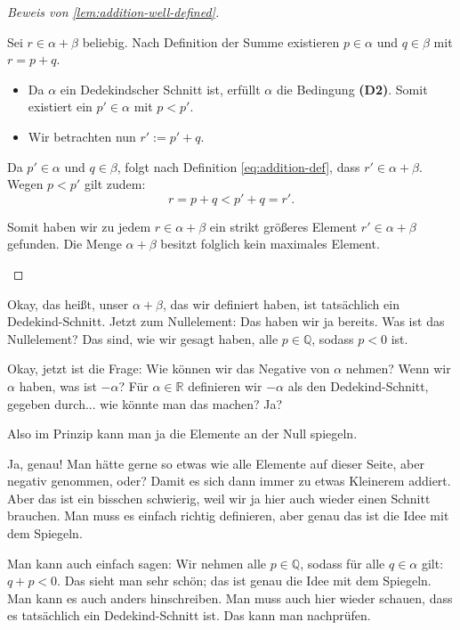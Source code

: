 \begin{proof}[Beweis von \cref{lem:addition-well-defined}]
\begin{math-stroke}
Sei $r \in\alpha + \beta$ beliebig. Nach Definition der Summe existieren $p \in \alpha$ und $q \in \beta$ mit $r = p + q$.

\begin{itemize}
    \item Da $\alpha$ ein Dedekindscher Schnitt ist, erfüllt $\alpha$ die Bedingung \textbf{(D2)}. Somit existiert ein $p' \in \alpha$ mit $p < p'$.
    \item Wir betrachten nun $r' := p' + q$. 
\end{itemize}

Da $p' \in \alpha$ und $q \in \beta$, folgt nach Definition \eqref{eq:addition-def}, dass $r' \in \alpha + \beta$. Wegen $p < p'$ gilt zudem:
\[ r = p + q < p' + q = r'. \]

Somit haben wir zu jedem $r \in \alpha + \beta$ ein strikt größeres Element $r' \in \alpha + \beta$ gefunden. Die Menge $\alpha + \beta$ besitzt folglich kein maximales Element.
\end{math-stroke}
\end{proof}

\begin{spoken-clean}[00:57:15 - 00:58:30]
Okay, das heißt, unser $\alpha + \beta$, das wir definiert haben, ist tatsächlich ein Dedekind-Schnitt. Jetzt zum Nullelement: Das haben wir ja bereits. Was ist das Nullelement? Das sind, wie wir gesagt haben, alle $p \in \mathbb{Q}$, sodass $p < 0$ ist.

Okay, jetzt ist die Frage: Wie können wir das Negative von $\alpha$ nehmen? Wenn wir $\alpha$ haben, was ist $-\alpha$? Für $\alpha \in \mathbb{R}$ definieren wir $-\alpha$ als den Dedekind-Schnitt, gegeben durch... wie könnte man das machen? Ja?
\end{spoken-clean}

\begin{student-interaction}
Also im Prinzip kann man ja die Elemente an der Null spiegeln.
\end{student-interaction}

\begin{spoken-clean}[00:58:30 - 00:59:45]
Ja, genau! Man hätte gerne so etwas wie alle Elemente auf dieser Seite, aber negativ genommen, oder? Damit es sich dann immer zu etwas Kleinerem addiert. Aber das ist ein bisschen schwierig, weil wir ja hier auch wieder einen Schnitt brauchen. Man muss es einfach richtig definieren, aber genau das ist die Idee mit dem Spiegeln.

Man kann auch einfach sagen: Wir nehmen alle $p \in \mathbb{Q}$, sodass für alle $q \in \alpha$ gilt: $q + p < 0$. Das sieht man sehr schön; das ist genau die Idee mit dem Spiegeln. Man kann es auch anders hinschreiben. Man muss auch hier wieder schauen, dass es tatsächlich ein Dedekind-Schnitt ist. Das kann man nachprüfen.
\end{spoken-clean}

